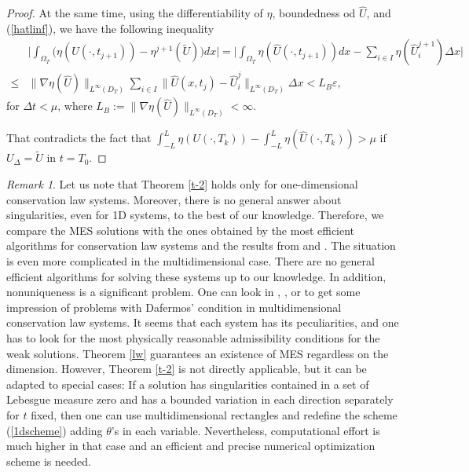 \documentclass[11pt,a4paper,reqno]{amsart}
\theoremstyle{plain}
\theoremstyle{definition}
\theoremstyle{remark}
\newtheorem{remark}{Remark}[section]
\numberwithin{equation}{section}
\begin{document}
{\begin{proof}
At the same time, using the differentiability of $\eta$, 
boundedness od $\widehat{U}$, and (\ref{hatlinf}), we have the following
inequality
\[
\begin{split}
& \Big| \int_{\Omega_{T}} \Big(\eta(\widehat{U}(\cdot,t_{j+1}))
- \eta^{j+1}(\widetilde{U})\Big) dx \Big| 
= \Big| \int_{\Omega_{T}}\eta(\widehat{U}(\cdot,t_{j+1}))dx 
- \sum_{i\in I}\eta(\widehat{U}_{i}^{j+1})\Delta x \Big| \\
\leq & \|\nabla \eta (\widehat{U})\|_{L^{\infty}(D_{T})}
\sum_{i\in I} \|\widehat{U}(x,t_{j})-\widehat{U}_{i}^{j}\|_{L^{\infty}(D_{T})} \Delta x
< L_{B}\varepsilon,
\end{split}
\]  
for $\Delta t<\mu$, where $L_{B}:=\|\nabla \eta (\widehat{U})\|_{L^{\infty}(D_{T})}
<\infty$.

That contradicts the fact that $\int_{-L}^{L} \eta(U(\cdot,T_{k})) 
- \int_{-L}^{L} \eta(\widehat{U}(\cdot,T_{k}))>\mu$ if $U_{\Delta}=\widetilde{U}$ in $t=T_{0}$.
\end{proof}

 
\begin{remark}
Let us note that Theorem \ref{t-2} holds only for one-dimensional 
conservation law systems. Moreover, there is no general answer about 
singularities, even for 1D systems, to the best of our knowledge. 
Therefore, we compare the MES solutions with the ones obtained by the most 
efficient algorithms for conservation law systems and the results 
from \cite{Bressan} and \cite{Diperna}.
The situation is even more complicated in the multidimensional case. 
There are no general efficient algorithms for solving these systems up to
our knowledge. 
In addition, nonuniqueness is a significant problem. One can look in 
\cite{CK2014}, \cite{DLS2010}, \cite{F2014} or \cite{FGSW}
to get some impression of problems with Dafermos' condition in 
multidimensional conservation law systems. It seems that each system 
has its peculiarities, and one has to look for the most physically 
reasonable admissibility conditions for the weak solutions.
Theorem \ref{lw} guarantees  an existence of MES regardless on the dimension. 
However, Theorem \ref{t-2} is not directly applicable, but  
it can be adapted to special cases: If a solution has singularities
contained in a set of Lebesgue measure zero and has a bounded variation
in each direction separately for $t$ fixed, then one can use multidimensional
rectangles and redefine the scheme (\ref{1dscheme}) adding $\theta$'s in
each variable. Nevertheless, computational effort is much higher in that
case and an efficient and precise numerical optimization scheme is needed.


\end{remark}}
\end{document}
